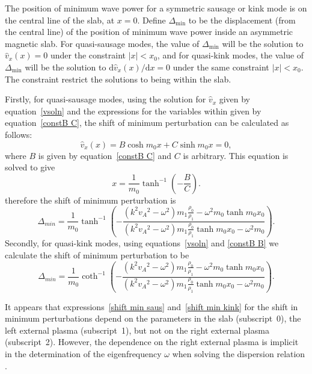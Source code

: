 \documentclass[namedreferences]{solarphysics}
\numberwithin{equation}{section}
\begin{document}
\begin{article}
The position of minimum wave power for a symmetric sausage or kink mode is on the central line of the slab, at $x=0$. Define $\Delta_\textrm{min}$ to be the displacement (from the central line) of the position of minimum wave power inside an asymmetric magnetic slab. For quasi-sausage modes, the value of $\Delta_\textrm{min}$ will be the solution to $\widehat{v}_x(x) = 0$ under the constraint $|x| < x_0$, and for quasi-kink modes, the value of $\Delta_\textrm{min}$ will be the solution to $\textrm{d}\widehat{v}_x (x) / \textrm{d}x = 0$ under the same constraint $|x| < x_0$. The constraint restrict the solutions to being within the slab. 

Firstly, for quasi-sausage modes, using the solution for $\widehat{v}_x$ given by equation~\eqref{vsoln} and the expressions for the variables within given by equation~\eqref{constB C}, the shift of minimum perturbation can be calculated as follows:
\begin{equation}
\widehat{v}_x(x) = B\cosh{m_0x}+C\sinh{m_0x} = 0,
\end{equation}
where $B$ is given by equation~\eqref{constB C} and $C$ is arbitrary. This equation is solved to give
\begin{equation}
x = \frac{1}{m_0} \tanh^{-1}\left(-\frac{B}{C}\right). \label{disp of min power saus}
\end{equation}
therefore the shift of minimum perturbation is
\begin{equation}
\Delta_{min} = \frac{1}{m_0}\tanh^{-1}\left(-\frac{(k^2{v_A}^2-\omega^2)m_1\frac{\rho_0}{\rho_1} - \omega^2{m_0}\tanh{m_0x_0}}{(k^2{v_A}^2-\omega^2)m_1\frac{\rho_0}{\rho_1}\tanh{m_0x_0} - \omega^2{m_0}}\right). \label{shift min saus}
\end{equation}
Secondly, for quasi-kink modes, using equations~\eqref{vsoln} and \eqref{constB B} we calculate the shift of minimum perturbation to be
\begin{equation}
\Delta_{min} = \frac{1}{m_0}\coth^{-1}\left(-\frac{(k^2{v_A}^2-\omega^2)m_1\frac{\rho_0}{\rho_1} - \omega^2{m_0}\tanh{m_0x_0}}{(k^2{v_A}^2-\omega^2)m_1\frac{\rho_0}{\rho_1}\tanh{m_0x_0} - \omega^2{m_0}}\right). \label{shift min kink}
\end{equation}

It appears that expressions~\eqref{shift min saus} and~\eqref{shift min kink} for the shift in minimum perturbations depend on the parameters in the slab (subscript~0), the left external plasma (subscript~1), but not on the right external plasma (subscript~2). However, the dependence on the right external plasma is implicit in the determination of the eigenfrequency $\omega$ when solving the dispersion relation \citep{all_etal17}.



\end{article}
\end{document}
